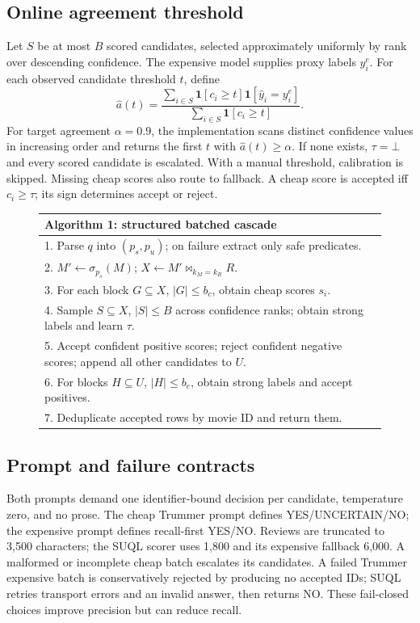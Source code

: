 \documentclass[sigconf,review]{acmart}
\begin{document}
\subsection{Online agreement threshold}
Let $S$ be at most $B$ scored candidates, selected approximately uniformly by
rank over descending confidence. The expensive model supplies proxy labels
$y_i^e$. For each observed candidate threshold $t$, define
\begin{equation}
 \widehat a(t)=\frac{\sum_{i\in S}\mathbf1[c_i\geq t]\mathbf1[\hat y_i=y_i^e]}
 {\sum_{i\in S}\mathbf1[c_i\geq t]}.
\end{equation}
For target agreement $\alpha=0.9$, the implementation scans distinct confidence
values in increasing order and returns the first $t$ with $\widehat a(t)\geq
\alpha$. If none exists, $\tau=\bot$ and every scored candidate is escalated.
With a manual threshold, calibration is skipped. Missing cheap scores also route
to fallback. A cheap score is accepted iff $c_i\geq\tau$; its sign determines
accept or reject.

\begin{figure}[t]
\small
\begin{tabular}{p{}}
\toprule
\textbf{Algorithm 1: structured batched cascade}\\\midrule
1. Parse $q$ into $(p_s,p_u)$; on failure extract only safe predicates.\\
2. $M'\leftarrow\sigma_{p_s}(M)$; $X\leftarrow M'\Join_{k_M=k_R}R$.\\
3. For each block $G\subseteq X$, $|G|\le b_c$, obtain cheap scores $s_i$.\\
4. Sample $S\subseteq X$, $|S|\le B$ across confidence ranks; obtain strong labels and learn $\tau$.\\
5. Accept confident positive scores; reject confident negative scores; append all other candidates to $U$.\\
6. For blocks $H\subseteq U$, $|H|\le b_e$, obtain strong labels and accept positives.\\
7. Deduplicate accepted rows by movie ID and return them.\\\bottomrule
\end{tabular}
\end{figure}

\subsection{Prompt and failure contracts}
Both prompts demand one identifier-bound decision per candidate, temperature zero,
and no prose. The cheap Trummer prompt defines YES/UNCERTAIN/NO; the expensive
prompt defines recall-first YES/NO. Reviews are truncated to 3,500 characters;
the SUQL scorer uses 1,800 and its expensive fallback 6,000. A malformed or
incomplete cheap batch escalates its candidates. A failed Trummer expensive batch
is conservatively rejected by producing no accepted IDs; SUQL retries transport
errors and an invalid answer, then returns NO. These fail-closed choices improve
precision but can reduce recall.
\end{document}
